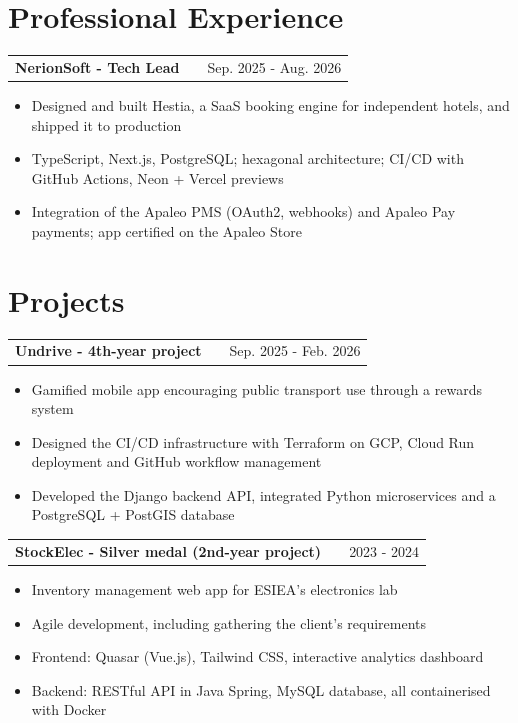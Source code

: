 \documentclass[a4paper,10pt]{article}
\makeatletter
\newenvironment{joblong}[2]
    {
    \begin{tabularx}{\linewidth}{@{}l X r@{}}
    \textbf{#1} & \hfill &  #2 \\[3.75pt]
    \end{tabularx}
    \begin{minipage}[t]{\linewidth}
    \begin{itemize}[nosep,after=\strut, leftmargin=1em, itemsep=2.5pt,label=--]
    }
    {
    \end{itemize}
    \end{minipage}    
    }
\makeatother
\begin{document}

\section{Professional Experience}

\begin{joblong}{NerionSoft - Tech Lead}{Sep. 2025 - Aug. 2026}
    \item Designed and built Hestia, a SaaS booking engine for independent hotels, and shipped it to production
    \item TypeScript, Next.js, PostgreSQL; hexagonal architecture; CI/CD with GitHub Actions, Neon + Vercel previews
    \item Integration of the Apaleo PMS (OAuth2, webhooks) and Apaleo Pay payments; app certified on the Apaleo Store
\end{joblong}

\section{Projects}

\begin{joblong}{Undrive - 4th-year project}{Sep. 2025 - Feb. 2026}
    \item Gamified mobile app encouraging public transport use through a rewards system
    \item Designed the CI/CD infrastructure with Terraform on GCP, Cloud Run deployment and GitHub workflow management
    \item Developed the Django backend API, integrated Python microservices and a PostgreSQL + PostGIS database
\end{joblong}

\begin{joblong}{StockElec - Silver medal (2nd-year project)}{2023 - 2024}
    \item Inventory management web app for ESIEA's electronics lab
    \item Agile development, including gathering the client's requirements
    \item Frontend: Quasar (Vue.js), Tailwind CSS, interactive analytics dashboard
    \item Backend: RESTful API in Java Spring, MySQL database, all containerised with Docker
\end{joblong}
\end{document}
